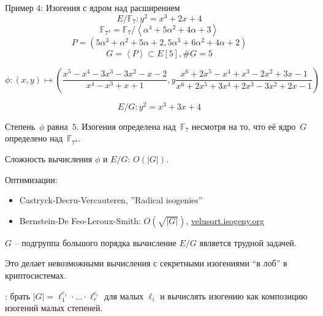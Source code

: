 \documentclass{beamer}
\begin{document}
\begin{frame}{Пример 4: Изогения с ядром над расширением}
	\[E/\mathbb{F}_{7}: y^2 = x^3 + 2 x + 4\]
	\[\mathbb{F}_{7^4} = \mathbb{F}_7 / \left< \alpha^4 + 5 \alpha^2 + 4 \alpha + 3 \right>\]
	\[P  = (5\alpha^3 + \alpha^2 + 5 \alpha + 2, 5 \alpha^3 + 6 \alpha^2 + 4 \alpha + 2)\]
	\[
	G = \left< P \right> \subset E[5],
	\#G = 5
	\]
	
	\begin{footnotesize}
	\[\phi: (x,y) \mapsto \left(\frac{x^5 - x^4 - 3 x^3 - 3 x^2 - x - 2}{x^4 - x^3 + x + 1}, y \frac{x^6 + 2 x^5 - x^4 + x^3 - 2 x^2 + 3 x - 1}{x^6 + 2 x^5 + 3 x^4 + 2 x^3 - 3 x^2 + 2 x - 1}\right)\]
	\end{footnotesize}

	
	\[E/G: y^2 = x^3 + 3 x + 4 \]
	\begin{center}
		Степень~$\phi$ равна~$5$. Изогения определена над~$\mathbb{F}_7$ несмотря на то, что её ядро~$G$ определено над~$\mathbb{F}_{7^4}$.
	\end{center}
\end{frame}

\begin{frame}
    Сложность вычисления $\phi$ и $E/G$: $O(|G|)$.

	\vspace{1em}
	Оптимизации:
	\begin{itemize}
		\item Castryck-Decru-Vercauteren, ''Radical isogenies''
		\item Bernstein-De Feo-Leroux-Smith: $O(\sqrt{|G|})$, \url{velusqrt.isogeny.org}
	\end{itemize}
	\vspace{1em}
	
	$G$ -- подгруппа большого порядка \structure{$\implies$} вычисление $E/G$ является трудной задачей.
	
	\vspace{1em}
	Это делает невозможными вычисления с секретными изогениями ``в лоб'' в криптосистемах.
	
	\vspace{1em} 
	: брать $|G| = \ell_1^{e_1} \cdot \ldots \cdot \ell_r^{e_r}$ для малых $\ell_i$ и вычислять изогению как композицию изогений малых степеней.
\end{frame}
\end{document}
